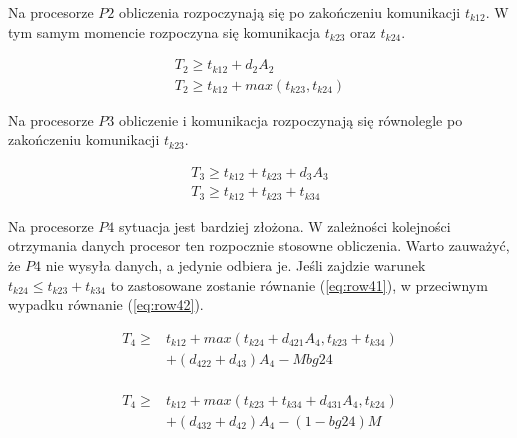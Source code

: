 Na procesorze $P2$ obliczenia rozpoczynają się po zakończeniu komunikacji $t_{k12}$.
W tym samym momencie rozpoczyna się komunikacja $t_{k23}$ oraz $t_{k24}$.

\begin{equation}
\begin{array}{l}
T_{2} \geq t_{k12} + d_{2}A_{2} \\
T_{2} \geq t_{k12} + max(t_{k23}, t_{k24})
\end{array}
\end{equation}

Na procesorze $P3$ obliczenie i komunikacja rozpoczynają się równolegle po zakończeniu komunikacji $t_{k23}$.

\begin{equation}
\begin{array}{l}
T_{3} \geq t_{k12} + t_{k23} + d_{3}A_{3} \\
T_{3} \geq t_{k12} + t_{k23} + t_{k34}
\end{array}
\end{equation}

Na procesorze $P4$ sytuacja jest bardziej złożona. W zależności kolejności otrzymania danych procesor ten rozpocznie stosowne obliczenia.
Warto zauważyć, że $P4$ nie wysyła danych, a jedynie odbiera je.
Jeśli zajdzie warunek $t_{k24} \leq t_{k23} + t_{k34}$ to zastosowane zostanie równanie (\ref{eq:row41}), w przeciwnym wypadku równanie (\ref{eq:row42}).

\begin{equation} \label{eq:row41}
\begin{array}{rl}
T_{4} \geq &t_{k12} + max(t_{k24} + d_{421}A_{4}, t_{k23} + t_{k34}) \\
&+ (d_{422} + d_{43})A_{4} - Mbg24 \\
\end{array}
\end{equation}

\begin{equation} \label{eq:row42}
\begin{array}{rl}
T_{4} \geq &t_{k12} + max(t_{k23} + t_{k34} + d_{431}A_{4}, t_{k24}) \\
&+ (d_{432} + d_{42})A_{4} - (1-bg24)M
\end{array}
\end{equation}
